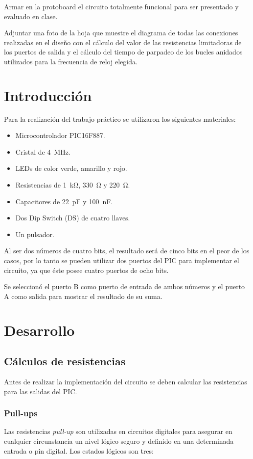 \documentclass[12pt,a4paper]{article}
\begin{document}
	Armar en la protoboard el circuito totalmente funcional para ser presentado y evaluado en clase.
	
	Adjuntar una foto de la hoja que muestre el diagrama de todas las conexiones realizadas en el diseño con el cálculo del valor de las resistencias limitadoras de los puertos de salida y el cálculo del tiempo de parpadeo de los bucles anidados utilizados para la frecuencia de reloj elegida.  

\newpage

\section{Introducción}
	Para la realización del trabajo práctico se utilizaron los siguientes materiales:
	
	\begin{itemize}[leftmargin=1.5cm,nosep]
	\item Microcontrolador PIC16F887.
	\item Cristal de \SI{4}{\MHz}.
	\item LEDs de color verde, amarillo y rojo.
	\item Resistencias de \SI{1}{\kilo\ohm}, \SI{330}{\ohm} y \SI{220}{\ohm}.
	\item Capacitores de \SI{22}{\pico\F} y \SI{100}{\nano\F}.
	\item Dos Dip Switch (DS) de cuatro llaves.
	\item Un pulsador.
	\end{itemize}

	Al ser dos números de cuatro bits, el resultado será de cinco bits en el peor de los casos, por lo tanto se pueden utilizar dos puertos del PIC para implementar el circuito, ya  que éste posee cuatro puertos de ocho bits.
	
	Se seleccionó el puerto B como puerto de entrada de ambos números y el puerto A como salida para mostrar el resultado de su suma.

\section{Desarrollo}
\subsection{Cálculos de resistencias}
	Antes de realizar la implementación del circuito se deben calcular las resistencias para las salidas del PIC.
	
\subsubsection{Pull-ups}
	Las resistencias \emph{pull-up} son utilizadas en circuitos digitales para asegurar en cualquier circunstancia un nivel lógico seguro y definido en una determinada entrada o pin digital. Los estados lógicos son tres:
\end{document}
